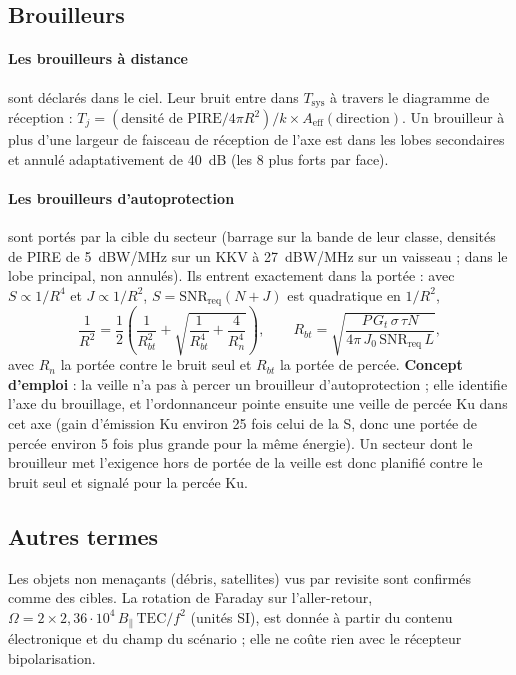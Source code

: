 \documentclass[11pt,a4paper]{article}
\newcommand{\Tsys}{T_{\mathrm{sys}}}
\newcommand{\SNR}{\mathrm{SNR}}
\begin{document}
\subsection{Brouilleurs}
\paragraph{Les brouilleurs à distance} sont déclarés dans le ciel. Leur bruit entre dans $\Tsys$ à travers le
diagramme de réception : $T_j = (\text{densité de PIRE}/4\pi R^2)/k \times A_{\mathrm{eff}}(\text{direction})$. Un
brouilleur à plus d'une largeur de faisceau de réception de l'axe est dans les lobes secondaires et annulé
adaptativement de \SI{40}{dB} (les 8 plus forts par face).

\paragraph{Les brouilleurs d'autoprotection} sont portés par la cible du secteur (barrage sur la bande de leur classe,
densités de PIRE de \SI{5}{dBW/MHz} sur un KKV à \SI{27}{dBW/MHz} sur un vaisseau ; dans le lobe principal, non
annulés). Ils entrent exactement dans la portée : avec $S \propto 1/R^4$ et $J \propto 1/R^2$,
$S = \SNR_{\mathrm{req}}(N + J)$ est quadratique en $1/R^2$,
\[
  \frac{1}{R^2} = \frac12\left(\frac{1}{R_{bt}^2} + \sqrt{\frac{1}{R_{bt}^4} + \frac{4}{R_n^4}}\right),\qquad
  R_{bt} = \sqrt{\frac{P\,G_t\,\sigma\,\tau N}{4\pi\,J_0\,\SNR_{\mathrm{req}}\,L}},
\]
avec $R_n$ la portée contre le bruit seul et $R_{bt}$ la portée de percée. \textbf{Concept d'emploi} : la veille n'a
pas à percer un brouilleur d'autoprotection ; elle identifie l'axe du brouillage, et l'ordonnanceur pointe ensuite une
veille de percée Ku dans cet axe (gain d'émission Ku environ 25 fois celui de la S, donc une portée de percée environ
5 fois plus grande pour la même énergie). Un secteur dont le brouilleur met l'exigence hors de portée de la veille est
donc planifié contre le bruit seul et signalé pour la percée Ku.

\subsection{Autres termes}
Les objets non menaçants (débris, satellites) vus par revisite sont confirmés comme des cibles. La rotation de Faraday
sur l'aller-retour, $\Omega = 2\times2,36\cdot10^4\,B_\parallel\,\mathrm{TEC}/f^2$ (unités SI), est donnée à partir du
contenu électronique et du champ du scénario ; elle ne coûte rien avec le récepteur bipolarisation.
\end{document}
